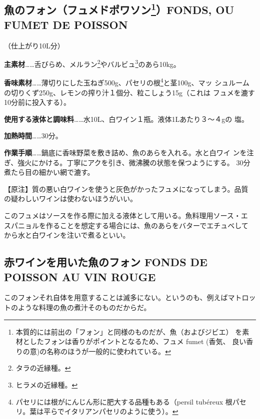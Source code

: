 \documentclass[twoside,12Q,b5paper,tombo]{escoffierltjsbook}
\newenvironment{recette}{\begin{multicols}{2}}{\end{multicols}}
\begin{document}
\begin{recette}
\subsection[魚のフォン（フュメドポワソン）FONDS, OU FUMET DE
POISSON]{\texorpdfstring{魚のフォン（フュメドポワソン\footnote{本質的には前出の「フォン」と同様のものだが、魚（およびジビエ）
  を素材としたフォンは香りがポイントとなるため、フュメ fumet (香気、
  良い香りの意)の名称のほうが一般的に使われている。}）FONDS, OU FUMET DE
POISSON}{魚のフォン（フュメドポワソン）FONDS, OU FUMET DE POISSON}}\label{ux9b5aux306eux30d5ux30a9ux30f3ux30d5ux30e5ux30e1ux30c9ux30ddux30efux30bdux30f313fonds-ou-fumet-de-poisson}

（仕上がり10L分）

\textbf{主素材}\ldots{}\ldots{}舌びらめ、メルラン\footnote{タラの近縁種。}やバルビュ\footnote{ヒラメの近縁種。}のあら10kg。

\textbf{香味素材}\ldots{}\ldots{}薄切りにした玉ねぎ500g、パセリの根\footnote{パセリには根がにんじん形に肥大する品種もある（persil
  tubéreux 根パセリ。葉は平らでイタリアンパセリのように使う）。}と茎100g、マッ
シュルームの切りくず250g、レモンの搾り汁１個分、粒こしょう15g（これは
フュメを漉す10分前に投入する）。

\textbf{使用する液体と調味料}\ldots{}\ldots{}水10L、白ワイン１瓶。液体1Lあたり３〜４gの
塩。

\textbf{加熱時間}\ldots{}\ldots{}30分。

\textbf{作業手順}\ldots{}\ldots{}鍋底に香味野菜を敷き詰め、魚のあらを入れる。水と白ワイ
ンを注ぎ、強火にかける。丁寧にアクを引き、微沸騰の状態を保つようにする。
30分煮たら目の細かい網で漉す。

【原注】質の悪い白ワインを使うと灰色がかったフュメになってしまう。品質
の疑わしいワインは使わないほうがいい。

このフュメはソースを作る際に加える液体として用いる。魚料理用ソース・エ
スパニョルを作ることを想定する場合には、魚のあらをバターでエチュベして
から水と白ワインを注いで煮るといい。

\subsection{赤ワインを用いた魚のフォン FONDS DE POISSON AU VIN
ROUGE}\label{ux8d64ux30efux30a4ux30f3ux3092ux7528ux3044ux305fux9b5aux306eux30d5ux30a9ux30f3-fonds-de-poisson-au-vin-rouge}

このフォンそれ自体を用意することは滅多にない。というのも、例えばマトロッ
トのような料理の魚の煮汁そのものだからだ。


\end{recette}
\end{document}

